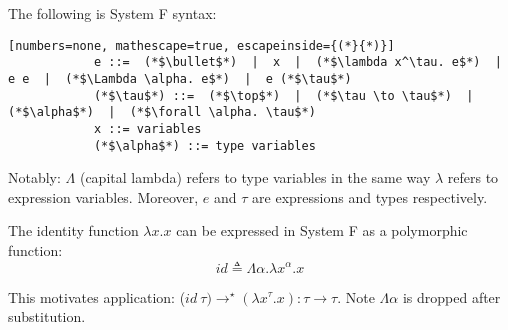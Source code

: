     \begin{Def}

        The following is System F syntax:
        \begin{lstlisting}[numbers=none, mathescape=true, escapeinside={(*}{*)}]
            e ::=  (*$\bullet$*)  |  x  |  (*$\lambda x^\tau. e$*)  |  e e  |  (*$\Lambda \alpha. e$*)  |  e (*$\tau$*)
            (*$\tau$*) ::=  (*$\top$*)  |  (*$\tau \to \tau$*)  |  (*$\alpha$*)  |  (*$\forall \alpha. \tau$*)
            x ::= variables
            (*$\alpha$*) ::= type variables
        \end{lstlisting}

        \noindent
    Notably: $\Lambda$ (capital lambda) refers to type variables in the same way $\lambda$ refers to expression variables. Moreover,
    $e$ and $\tau$ are expressions and types respectively.
    \end{Def}

    \begin{Def}

        The identity function $\lambda x.x$ can be expressed in System F as a polymorphic function:
        \large 
        \[
        id \triangleq \Lambda \alpha. \lambda x^{\alpha}. x
        \]
        \normalsize

        \noindent
        This motivates application: ($id\ \tau) \rightarrow^\star (\lambda x^\tau.x):\tau\to\tau$. Note $\Lambda\alpha$ is dropped after substitution.
    \end{Def}

